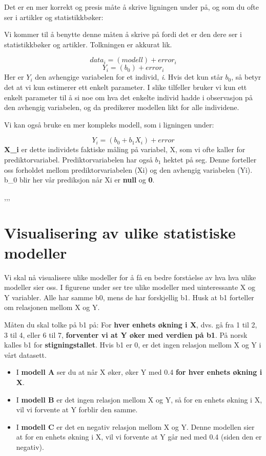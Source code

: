 \documentclass[
]{book}
\begin{document}
Det er en mer korrekt og presis måte å skrive ligningen under på, og som du ofte ser i artikler og statistikkbøker:

Vi kommer til å benytte denne måten å skrive på fordi det er den dere ser i statistikkbøker og artikler. Tolkningen er akkurat lik.

\[
data_i = (modell) + error_i
\]
\[
Y_i = (b_0) + error_i
\]
Her er \(Y_i\) den avhengige variabelen for et individ, \emph{i}. Hvis det kun står \(b_0\), så betyr det at vi kun estimerer ett enkelt parameter. I slike tilfeller bruker vi kun ett enkelt parameter til å si noe om hva det enkelte individ hadde i observasjon på den avhengig variabelen, og da predikerer modellen likt for alle individene.

Vi kan også bruke en mer kompleks modell, som i ligningen under:

\[
Y_i = (b_0 + b_1X_i) + error
\]
\textbf{X\_i} er dette individets faktiske måling på variabel, X, som vi ofte kaller for prediktorvariabel. Prediktorvariabelen har også \(b_1\) hektet på seg. Denne forteller oss forholdet mellom prediktorvariabelen (Xi) og den avhengig variabelen (Yi). b\_0 blir her vår prediksjon når Xi er \textbf{null} og \textbf{0}.

,,,

\hypertarget{visualisering-av-ulike-statistiske-modeller}{%
\section{Visualisering av ulike statistiske modeller}\label{visualisering-av-ulike-statistiske-modeller}}

Vi skal nå visualisere ulike modeller for å få en bedre forståelse av hva hva ulike modeller sier oss. I figurene under ser tre ulike modeller med uinteressante X og Y variabler. Alle har samme b0, mens de har forskjellig b1. Husk at b1 forteller om relasjonen mellom X og Y.

Måten du skal tolke på b1 på: For \textbf{hver enhets økning i X}, dvs. gå fra 1 til 2, 3 til 4, eller 6 til 7, \textbf{forventer vi at Y øker med verdien på b1}. På norsk kalles b1 for \textbf{stigningstallet}. Hvis b1 er 0, er det ingen relasjon mellom X og Y i vårt datasett.

\begin{itemize}
\item
  I \textbf{modell A} ser du at når X øker, øker Y med 0.4 \textbf{for hver enhets økning i X}.
\item
  I \textbf{modell B} er det ingen relasjon mellom X og Y, så for en enhets økning i X, vil vi forvente at Y forblir den samme.
\item
  I \textbf{modell C} er det en negativ relasjon mellom X og Y. Denne modellen sier at for en enhets økning i X, vil vi forvente at Y går ned med 0.4 (siden den er negativ).
\end{itemize}
\end{document}
